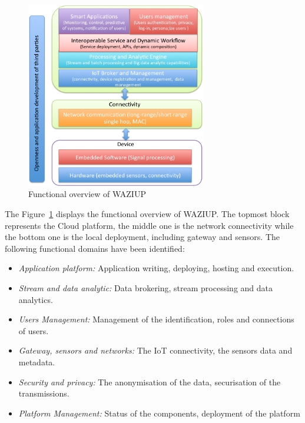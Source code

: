 \begin{figure}[h!]
\centering
\includegraphics[width=0.7\textwidth]{figs/functional.png}
\caption{Functional overview of WAZIUP}
\label{fig:func}
\end{figure}

The Figure~\ref{fig:func} displays the functional overview of WAZIUP.
The topmost block represents the Cloud platform, the middle one is the network connectivity while the bottom one is the local deployment, including gateway and sensors.
The following functional domains have been identified:

\begin{itemize}
  \item \emph{Application platform:}
	Application writing, deploying, hosting and execution.
  \item \emph{Stream and data analytic:}
	Data brokering, stream processing and data analytics.
  \item \emph{Users Management:}
	Management of the identification, roles and connections of users.
  \item \emph{Gateway, sensors and networks:}
	The IoT connectivity, the sensors data and metadata.
  \item \emph{Security and privacy:}
	The anonymisation of the data, securisation of the transmissions.
  \item \emph{Platform Management:}
	Status of the components, deployment of the platform
\end{itemize}

